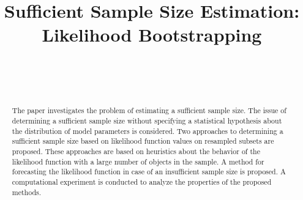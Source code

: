 \documentclass[
11pt,%
tightenlines,%
twoside,%
onecolumn,%
nofloats,%
nobibnotes,%
nofootinbib,%
superscriptaddress,%
noshowpacs,%
centertags]%
{revtex4-2}
\begin{document}

\title{Sufficient Sample Size Estimation:\\ Likelihood Bootstrapping}

\author{~}

\author{~}




\begin{abstract} %
    The paper investigates the problem of estimating a sufficient sample size. The issue of determining a sufficient sample size without specifying a statistical hypothesis about the distribution of model parameters is considered. Two approaches to determining a sufficient sample size based on likelihood function values on resampled subsets are proposed. These approaches are based on heuristics about the behavior of the likelihood function with a large number of objects in the sample. A method for forecasting the likelihood function in case of an insufficient sample size is proposed. A computational experiment is conducted to analyze the properties of the proposed methods.
\end{abstract}


\end{document}
